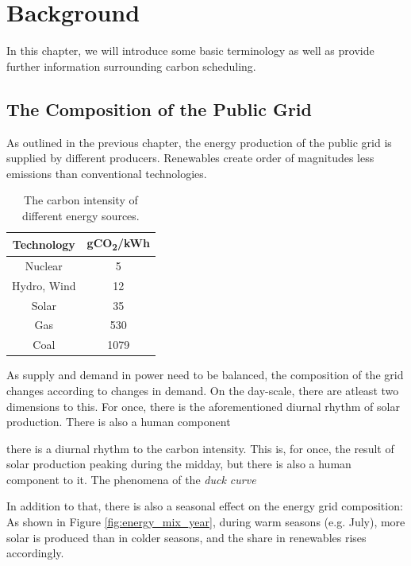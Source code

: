 \chapter{Background}
\label{chap:backgroud}

In this chapter, we will introduce some basic terminology as well as provide further information surrounding carbon scheduling.

\section{The Composition of the Public Grid}

As outlined in the previous chapter, the energy production of the public grid is supplied by different producers.
Renewables create order of magnitudes less emissions than conventional technologies.  

\begin{table}[h!]
    \centering
    \begin{tabular}{|c|c|}
    \hline
        Technology & gCO\textsubscript{2}/kWh \\ \hline
        Nuclear & 5 \\ \hline
        Hydro, Wind & 12 \\ \hline
        Solar & 35 \\ \hline
        Gas & 530 \\ \hline
        Coal & 1079 \\ \hline
    \end{tabular}
    \caption{The carbon intensity of different energy sources.}
    \label{tab:carbon_intensities}
\end{table}

As supply and demand in power need to be balanced, the composition of the grid changes according to changes in demand.
On the day-scale, there are atleast two dimensions to this. For once, there is the aforementioned diurnal rhythm of solar production. There is also a human component

there is a diurnal rhythm to the carbon intensity. This is, for once, the result of solar production peaking during the midday, but there is also a human component to it. The phenomena of the \emph{duck curve}

In addition to that, there is also a seasonal effect on the energy grid composition:
As shown in Figure \ref{fig:energy_mix_year}, during warm seasons (e.g. July), more solar is produced than in colder seasons, and the share in renewables rises accordingly.

